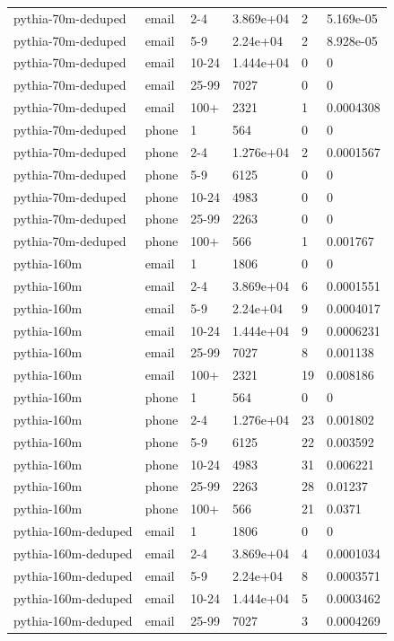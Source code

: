 \begin{tabular}{llllll}
pythia-70m-deduped & email & 2-4 & 3.869e+04 & 2 & 5.169e-05 \\
pythia-70m-deduped & email & 5-9 & 2.24e+04 & 2 & 8.928e-05 \\
pythia-70m-deduped & email & 10-24 & 1.444e+04 & 0 & 0 \\
pythia-70m-deduped & email & 25-99 & 7027 & 0 & 0 \\
pythia-70m-deduped & email & 100+ & 2321 & 1 & 0.0004308 \\
pythia-70m-deduped & phone & 1 & 564 & 0 & 0 \\
pythia-70m-deduped & phone & 2-4 & 1.276e+04 & 2 & 0.0001567 \\
pythia-70m-deduped & phone & 5-9 & 6125 & 0 & 0 \\
pythia-70m-deduped & phone & 10-24 & 4983 & 0 & 0 \\
pythia-70m-deduped & phone & 25-99 & 2263 & 0 & 0 \\
pythia-70m-deduped & phone & 100+ & 566 & 1 & 0.001767 \\
pythia-160m & email & 1 & 1806 & 0 & 0 \\
pythia-160m & email & 2-4 & 3.869e+04 & 6 & 0.0001551 \\
pythia-160m & email & 5-9 & 2.24e+04 & 9 & 0.0004017 \\
pythia-160m & email & 10-24 & 1.444e+04 & 9 & 0.0006231 \\
pythia-160m & email & 25-99 & 7027 & 8 & 0.001138 \\
pythia-160m & email & 100+ & 2321 & 19 & 0.008186 \\
pythia-160m & phone & 1 & 564 & 0 & 0 \\
pythia-160m & phone & 2-4 & 1.276e+04 & 23 & 0.001802 \\
pythia-160m & phone & 5-9 & 6125 & 22 & 0.003592 \\
pythia-160m & phone & 10-24 & 4983 & 31 & 0.006221 \\
pythia-160m & phone & 25-99 & 2263 & 28 & 0.01237 \\
pythia-160m & phone & 100+ & 566 & 21 & 0.0371 \\
pythia-160m-deduped & email & 1 & 1806 & 0 & 0 \\
pythia-160m-deduped & email & 2-4 & 3.869e+04 & 4 & 0.0001034 \\
pythia-160m-deduped & email & 5-9 & 2.24e+04 & 8 & 0.0003571 \\
pythia-160m-deduped & email & 10-24 & 1.444e+04 & 5 & 0.0003462 \\
pythia-160m-deduped & email & 25-99 & 7027 & 3 & 0.0004269 \\

\end{tabular}
